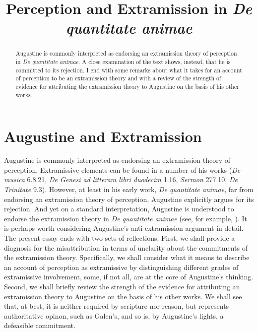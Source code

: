 \documentclass[12pt]{article}
\title{Perception and Extramission in \emph{De quantitate animae}}
\author{\myauthor}
\date{} %
\begin{document}
\maketitle
\begin{abstract}
	\noindent Augustine is commonly interpreted as endorsing an extramission theory of perception in \emph{De quantitate animae}. A close examination of the text shows, instead, that he is committed to its rejection. I end with some remarks about what it takes for an account of perception to be an extramission theory and with a review of the strength of evidence for attributing the extramission theory to Augustine on the basis of his other works.
\end{abstract}

\setlength{\parindent}{1em}


\section{Augustine and Extramission} %
\label{sec:augustine_and_extramission}

Augustine is commonly interpreted as endorsing an extramission theory of perception. Extramissive elements can be found in a number of his works (\emph{De musica} 6.8.21, \emph{De Genesi ad litteram libri duodecim} 1.16, \emph{Sermon} 277.10, \emph{De Trinitate} 9.3). However, at least in his early work, \emph{De quantitate animae}, far from endorsing an extramission theory of perception, Augustine explicitly argues for its rejection. And yet on a standard interpretation, Augustine is understood to endorse the extramission theory in \emph{De quantitate animae} (see, for example, \citealt[82--3]{ODaly:1987fq}). It is perhaps worth considering Augustine's anti-extramission argument in detail. The present essay ends with two sets of reflections. First, we shall provide a diagnosis for the misattribution in terms of unclarity about the commitments of the extramission theory. Specifically, we shall consider what it means to describe an account of perception as extramissive by distinguishing different grades of extramissive involvement, some, if not all, are at the core of Augustine's thinking. Second, we shall briefly review the strength of the evidence for attributing an extramission theory to Augustine on the basis of his other works. We shall see that, at best, it is neither required by scripture nor reason, but represents authoritative opinon, such as Galen's, and so is, by Augustine's lights, a defeasible commitment.
\end{document}

